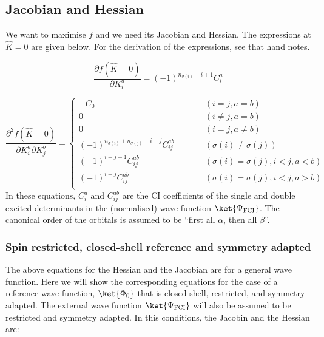 \documentclass[a4paper,11pt]{article}
\begin{document}
\subsection{Jacobian and Hessian}

We want to maximise $f$ and we need its Jacobian and Hessian.
The expressions at $\hat{K} = 0$ are given below.
For the derivation of the expressions, see that hand notes.

\begin{equation}
  \frac{\partial f(\hat{K} = 0)}{\partial K_i^a} = (-1)^{n_{\sigma(i)} - i + 1} C_i^a
\end{equation}

\begin{equation}
  \frac{\partial^2 f(\hat{K} = 0)}{\partial K_i^a \partial K_j^b} =
  \left\{
    \begin{array}{lcr}
      -C_0 & \quad\quad & (i = j, a = b)\\
      0   &  \quad\quad & (i \ne j, a = b)\\
      0   &  \quad\quad & (i = j, a \ne b)\\
      (-1)^{n_{\sigma(i)}+n_{\sigma(j)}-i-j}C_{ij}^{ab} & \quad\quad & (\sigma(i) \ne \sigma(j))\\
      (-1)^{i+j+1}C_{ij}^{ab} & \quad\quad & (\sigma(i) = \sigma(j), i<j, a<b)\\
      (-1)^{i+j}C_{ij}^{ab} & \quad\quad & (\sigma(i) = \sigma(j), i<j, a>b)\\
    \end{array}
  \right.
\end{equation}
In these equations, $C_i^a$ and $C_{ij}^{ab}$ are the CI coefficients of the single and double excited determinants in the (normalised) wave function $\ket{\Psi_\text{FCI}}$.
The canonical order of the orbitals is assumed to be ``first all $\alpha$, then all $\beta$''.

\subsubsection{Spin restricted, closed-shell reference and symmetry adapted}

The above equations for the Hessian and the Jacobian are for a general wave function.
Here we will show the corresponding equations for the case of a reference wave function, $\ket{\Phi_0}$ that is closed shell, restricted, and symmetry adapted.
The external wave function $\ket{\Psi_\text{FCI}}$ will also be assumed to be restricted and symmetry adapted.
In this conditions, the Jacobin and the Hessian are:
\end{document}
